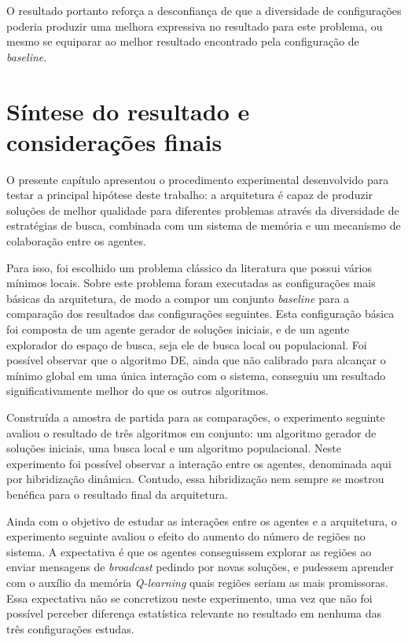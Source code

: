 O resultado portanto reforça a desconfiança de que a diversidade de configurações poderia produzir uma melhora expressiva no resultado para este problema, ou mesmo se equiparar ao melhor resultado encontrado pela configuração de \textit{baseline}.   

\section{Síntese do resultado e considerações finais}
\label{sec:sinteseDiversidade}

O presente capítulo apresentou o procedimento experimental desenvolvido para testar a principal hipótese deste trabalho: a arquitetura é capaz de produzir soluções de melhor qualidade para diferentes problemas através da diversidade de estratégias
de busca, combinada com um sistema de memória e um mecanismo de colaboração entre
os agentes.

Para isso, foi escolhido um problema clássico da literatura que possui vários mínimos locais. Sobre este problema foram executadas as configurações mais básicas da arquitetura, de modo a compor um conjunto \textit{baseline} para a comparação dos resultados das configurações seguintes. Esta configuração básica foi composta de um agente gerador de soluções iniciais, e de um agente explorador do espaço de busca, seja ele de busca local ou populacional. Foi possível observar que o algoritmo DE, ainda que não calibrado para alcançar o mínimo global em uma única interação com o sistema, conseguiu um resultado significativamente melhor do que os outros algoritmos. 

Construída a amostra de partida para as comparações, o experimento seguinte avaliou o resultado de três algoritmos em conjunto: um algoritmo gerador de soluções iniciais, uma busca local e um algoritmo populacional. Neste experimento foi possível observar a interação entre os agentes, denominada aqui por hibridização dinâmica. Contudo, essa hibridização nem sempre se mostrou benéfica para o resultado final da arquitetura. 

Ainda com o objetivo de estudar as interações entre os agentes e a arquitetura, o experimento seguinte avaliou o efeito do aumento do número de regiões no sistema. A expectativa é que os agentes conseguissem explorar as regiões ao enviar mensagens de \textit{broadcast} pedindo por novas soluções, e pudessem aprender com o auxílio da memória \textit{Q-learning} quais regiões seriam as mais promissoras. Essa expectativa não se concretizou neste experimento, uma vez que não foi possível perceber diferença estatística relevante no resultado em nenhuma das três configurações estudas. 

